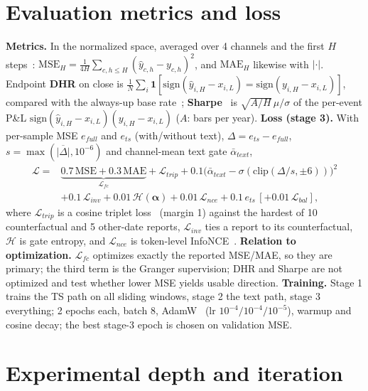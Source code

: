 \documentclass{article}
\begin{document}
\section{Evaluation metrics and loss}
\textbf{Metrics.} In the normalized space, averaged over 4 channels and the first $H$ steps~\cite{hyndman}: $\mathrm{MSE}_H=\frac{1}{4H}\sum_{c,h\le H}(\hat y_{c,h}-y_{c,h})^2$, and $\mathrm{MAE}_H$ likewise with $|\cdot|$.
Endpoint \textbf{DHR} on close is $\frac1N\sum_i \mathbf{1}[\mathrm{sign}(\hat y_{i,H}-x_{i,L})=\mathrm{sign}(y_{i,H}-x_{i,L})]$, compared with the always-up base rate~\cite{pesaran}; \textbf{Sharpe}~\cite{sharpe} is $\sqrt{A/H}\,\mu/\sigma$ of the per-event P\&L $\mathrm{sign}(\hat y_{i,H}-x_{i,L})(y_{i,H}-x_{i,L})$ ($A$: bars per year).
\textbf{Loss (stage 3).} With per-sample MSE $e_{full}$ and $e_{ts}$ (with/without text), $\Delta=e_{ts}-e_{full}$, $s=\max(\overline{|\Delta|},10^{-6})$ and channel-mean text gate $\bar\alpha_{text}$,
\begin{equation}
\begin{aligned}
\mathcal{L}={}&\underbrace{0.7\,\mathrm{MSE}+0.3\,\mathrm{MAE}}_{\mathcal{L}_{fc}}
+\mathcal{L}_{trip}
+0.1\big(\bar\alpha_{text}-\sigma(\mathrm{clip}(\Delta/s,\pm6))\big)^2\\
&+0.1\,\mathcal{L}_{inv}+0.01\,\mathcal{H}(\bm\alpha)+0.01\,\mathcal{L}_{nce}+0.1\,e_{ts}\,[+0.01\,\mathcal{L}_{bal}],
\end{aligned}
\end{equation}
where $\mathcal{L}_{trip}$ is a cosine triplet loss~\cite{facenet} (margin 1) against the hardest of 10 counterfactual and 5 other-date reports, $\mathcal{L}_{inv}$ ties a report to its counterfactual, $\mathcal{H}$ is gate entropy, and $\mathcal{L}_{nce}$ is token-level InfoNCE~\cite{cpc}.
\textbf{Relation to optimization.} $\mathcal{L}_{fc}$ optimizes exactly the reported MSE/MAE, so they are primary; the third term is the Granger supervision; DHR and Sharpe are not optimized and test whether lower MSE yields usable direction.
\textbf{Training.} Stage 1 trains the TS path on all sliding windows, stage 2 the text path, stage 3 everything; 2 epochs each, batch 8, AdamW~\cite{adamw} (lr $10^{-4}/10^{-4}/10^{-5}$), warmup and cosine decay; the best stage-3 epoch is chosen on validation MSE.

\section{Experimental depth and iteration}
\end{document}

